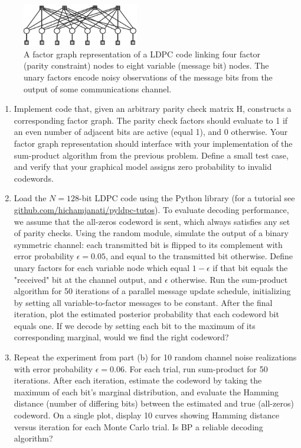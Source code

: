 \documentclass{article}
\begin{document}
\begin{enumerate}
\begin{figure}[t]
\centering
\includegraphics[width=2in]{brown_hw2}
\caption{A factor graph representation of a LDPC code linking four factor (parity constraint)
nodes to eight variable (message bit) nodes. The unary factors encode noisy observations of the
message bits from the output of some communications channel.}
\label{fig:factor}
\end{figure}

\begin{enumerate}
\item Implement code that, given an arbitrary parity check matrix H, constructs a corresponding factor graph. The parity check factors should evaluate to 1 if an even number of adjacent bits are active (equal 1), and 0 otherwise. Your factor graph representation should interface with your implementation of the sum-product algorithm from the previous problem. Define a small test case, and verify that your graphical model assigns zero probability to invalid codewords.
\item Load the $N = 128$-bit LDPC code using the Python library  (for a tutorial see \url {github.com/hichamjanati/pyldpc-tutos}).  To evaluate decoding
performance, we assume that the all-zeros codeword is sent, which always satisfies any set of parity checks. Using the random module, simulate the output of a binary symmetric
channel: each transmitted bit is flipped to its complement with error probability $\epsilon =0.05$, and equal to the transmitted bit otherwise. Define unary factors for each variable node
which equal $1-\epsilon$ if that bit equals the "received" bit at the channel output, and $\epsilon$ otherwise. Run the sum-product algorithm for 50 iterations of a parallel message update schedule, initializing by setting all variable-to-factor messages to be constant. After the final iteration, plot the estimated posterior probability that each codeword bit equals one.
If we decode by setting each bit to the maximum of its corresponding marginal, would we find the right codeword?
\item Repeat the experiment from part (b) for 10 random channel noise realizations with error probability $\epsilon= 0.06$. For each trial, run sum-product for 50 iterations. After each iteration, estimate the codeword by taking the maximum of each bit's marginal distribution, and evaluate the Hamming distance (number of differing bits) between the estimated and true (all-zeros) codeword. On a single plot, display 10 curves showing Hamming distance versus iteration for each Monte Carlo trial. Is BP a reliable decoding algorithm?

\end{enumerate}
\end{enumerate}
\end{document}
